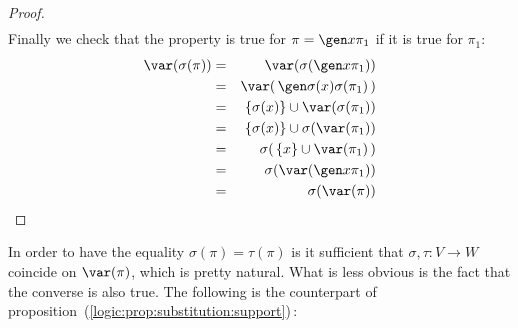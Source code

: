 \begin{proof}
\begin{eqnarray*}
    \end{eqnarray*}
Finally we check that the property is true for $\pi=\gen x\pi_{1}$
if it is true for $\pi_{1}$:
    \begin{eqnarray*}
    \var(\sigma(\pi))&=&\var(\sigma(\gen x\pi_{1}))\\
    &=&\var(\,\gen\sigma(x)\sigma(\pi_{1})\,)\\
    &=&\{\sigma(x)\}\cup\var(\sigma(\pi_{1}))\\
    &=&\{\sigma(x)\}\cup\sigma(\var(\pi_{1}))\\
    &=&\sigma(\,\{x\}\cup\var(\pi_{1})\,)\\
    &=&\sigma(\var(\gen x\pi_{1}))\\
    &=&\sigma(\var(\pi))\\
    \end{eqnarray*}
\end{proof}


In order to have the equality $\sigma(\pi)=\tau(\pi)$ is it
sufficient that $\sigma,\tau:V\to W$ coincide on $\var(\pi)$, which
is pretty natural. What is less obvious is the fact that the
converse is also true. The following is the counterpart of
proposition~(\ref{logic:prop:substitution:support})\,:

